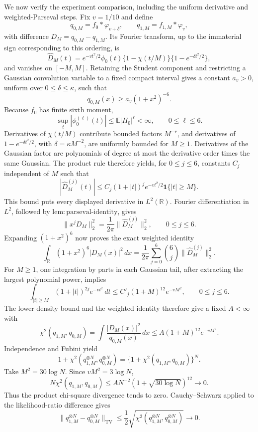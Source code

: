 We now verify the experiment comparison, including the uniform derivative and weighted-Parseval steps.  Fix \(v=1/10\) and define
\[
 q_{0,M}=f_0*\varphi_{v+\delta},\qquad
 q_{1,M}=f_{1,M}*\varphi_v,
\]
with difference \(D_M=q_{0,M}-q_{1,M}\).  Its Fourier transform, up to the immaterial sign corresponding to this ordering, is
\[
 \widehat D_M(t)=e^{-vt^2/2}\phi_0(t)
 \{1-\chi(t/M)\}\{1-e^{-\delta t^2/2}\},
\]
and vanishes on \([-M,M]\).  Retaining the Student component and restricting a Gaussian convolution variable to a fixed compact interval gives a constant \(a_v>0\), uniform over \(0\le\delta\le\kappa\), such that
\[
 q_{0,M}(x)\ge a_v(1+x^2)^{-6}.
\]
Because \(f_0\) has finite sixth moment,
\[
 \sup_t|\phi_0^{(\ell)}(t)|\le\mathbb E|H_0|^\ell<\infty,
 \qquad 0\le\ell\le6.
\]
Derivatives of \(\chi(t/M)\) contribute bounded factors \(M^{-r}\), and derivatives of \(1-e^{-\delta t^2/2}\), with \(\delta=\kappa M^{-2}\), are uniformly bounded for \(M\ge1\).  Derivatives of the Gaussian factor are polynomials of degree at most the derivative order times the same Gaussian.  The product rule therefore yields, for \(0\le j\le6\), constants \(C_j\) independent of \(M\) such that
\[
 |\widehat D_M^{(j)}(t)|
 \le C_j(1+|t|)^j e^{-vt^2/2}
       \mathbf 1\{|t|\ge M\}.
\]
This bound puts every displayed derivative in \(L^2(\mathbb R)\).  Fourier differentiation in \(L^2\), followed by \(\mathrm{lem:parseval\text{-}identity}\), gives
\[
 \|x^jD_M\|_2^2=\frac1{2\pi}\|\widehat D_M^{(j)}\|_2^2,
 \qquad 0\le j\le6.
\]
Expanding \((1+x^2)^6\) now proves the exact weighted identity
\[
 \int_{\mathbb R}(1+x^2)^6|D_M(x)|^2\,dx
 =\frac1{2\pi}\sum_{j=0}^6\binom6j
   \|\widehat D_M^{(j)}\|_2^2.
\]
For \(M\ge1\), one integration by parts in each Gaussian tail, after extracting the largest polynomial power, implies
\[
 \int_{|t|\ge M}(1+|t|)^{2j}e^{-vt^2}\,dt
 \le C'_j(1+M)^{12}e^{-vM^2},
 \qquad 0\le j\le6.
\]
The lower density bound and the weighted identity therefore give a fixed \(A<\infty\) with
\[
 \chi^2(q_{1,M},q_{0,M})
 =\int\frac{|D_M(x)|^2}{q_{0,M}(x)}\,dx
 \le A(1+M)^{12}e^{-vM^2}.
\]
Independence and Fubini yield
\[
 1+\chi^2(q_{1,M}^{\otimes N},q_{0,M}^{\otimes N})
 =\{1+\chi^2(q_{1,M},q_{0,M})\}^N.
\]
Take \(M^2=30\log N\).  Since \(vM^2=3\log N\),
\[
 N\chi^2(q_{1,M},q_{0,M})
 \le A N^{-2}(1+\sqrt{30\log N})^{12}\longrightarrow0.
\]
Thus the product chi-square divergence tends to zero.  Cauchy--Schwarz applied to the likelihood-ratio difference gives
\[
 \|q_{1,M}^{\otimes N}-q_{0,M}^{\otimes N}\|_{\mathrm{TV}}
 \le\frac12\sqrt{\chi^2(q_{1,M}^{\otimes N},q_{0,M}^{\otimes N})}
 \longrightarrow0.
\]

